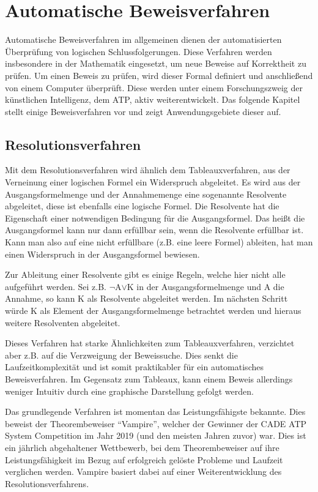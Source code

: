 
\chapter{Automatische Beweisverfahren}
Automatische Beweisverfahren im allgemeinen dienen der automatisierten Überprüfung von logischen Schlussfolgerungen. Diese Verfahren werden insbesondere in der Mathematik eingesetzt, um neue Beweise auf Korrektheit zu prüfen. Um einen Beweis zu prüfen, wird dieser Formal definiert und anschließend von einem Computer überprüft. Diese werden unter einem Forschungszweig der künstlichen Intelligenz, dem \ac{ATP}, aktiv weiterentwickelt. Das folgende Kapitel stellt einige Beweisverfahren vor und zeigt Anwendungsgebiete dieser auf.

\section{Resolutionsverfahren}
Mit dem Resolutionsverfahren wird ähnlich dem Tableauxverfahren, aus der Verneinung einer logischen Formel ein Widerspruch abgeleitet. Es wird aus der Ausgangsformelmenge und der Annahmemenge eine sogenannte Resolvente abgeleitet, diese ist ebenfalls eine logische Formel. Die Resolvente hat die Eigenschaft einer notwendigen Bedingung für die Ausgangsformel. Das heißt die Ausgangsformel kann nur dann erfüllbar sein, wenn die Resolvente erfüllbar ist. Kann man also auf eine nicht erfüllbare (z.B. eine leere Formel) ableiten, hat man einen Widerspruch in der Ausgangsformel bewiesen. \cite{RN16}

Zur Ableitung einer Resolvente gibt es einige Regeln, welche hier nicht alle aufgeführt werden. Sei z.B. $\neg$A$\vee$K in der Ausgangsformelmenge und A die Annahme, so kann K als Resolvente abgeleitet werden. Im nächsten Schritt würde K als Element der Ausgangsformelmenge betrachtet werden und hieraus weitere Resolventen abgeleitet. \cite{RN16}

Dieses Verfahren hat starke Ähnlichkeiten zum Tableauxverfahren, verzichtet aber z.B. auf die Verzweigung der Beweissuche. Dies senkt die Laufzeitkomplexität und ist somit praktikabler für ein automatisches Beweisverfahren. Im Gegensatz zum Tableaux, kann einem Beweis allerdings weniger Intuitiv durch eine graphische Darstellung gefolgt werden.

Das grundlegende Verfahren ist momentan das Leistungsfähigste bekannte. Dies beweist der Theorembeweiser ``Vampire'', welcher der Gewinner der CADE ATP System Competition im Jahr 2019 (und den meisten Jahren zuvor) war. Dies ist ein jährlich abgehaltener Wettbewerb, bei dem Theorembeweiser auf ihre Leistungsfähigkeit im Bezug auf erfolgreich gelöste Probleme und Laufzeit verglichen werden. \cite{casc_atp_comp} Vampire basiert dabei auf einer Weiterentwicklung des Resolutionsverfahrens.

